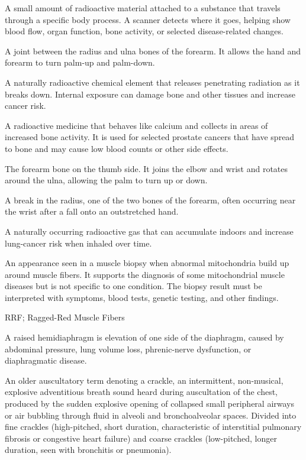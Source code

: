  A small amount of radioactive material attached to a substance that travels through a specific body process. A scanner detects where it goes, helping show blood flow, organ function, bone activity, or selected disease-related changes.

 A joint between the radius and ulna bones of the forearm. It allows the hand and forearm to turn palm-up and palm-down.

 A naturally radioactive chemical element that releases penetrating radiation as it breaks down. Internal exposure can damage bone and other tissues and increase cancer risk.

 A radioactive medicine that behaves like calcium and collects in areas of increased bone activity. It is used for selected prostate cancers that have spread to bone and may cause low blood counts or other side effects.

 The forearm bone on the thumb side. It joins the elbow and wrist and rotates around the ulna, allowing the palm to turn up or down.

 A break in the radius, one of the two bones of the forearm, often occurring near the wrist after a fall onto an outstretched hand.

 A naturally occurring radioactive gas that can accumulate indoors and increase lung-cancer risk when inhaled over time.

 An appearance seen in a muscle biopsy when abnormal mitochondria build up around muscle fibers. It supports the diagnosis of some mitochondrial muscle diseases but is not specific to one condition. The biopsy result must be interpreted with symptoms, blood tests, genetic testing, and other findings.

\synonyms
RRF; Ragged-Red Muscle Fibers

 A raised hemidiaphragm is elevation of one side of the diaphragm, caused by abdominal pressure, lung volume loss, phrenic-nerve dysfunction, or diaphragmatic disease.

 An older auscultatory term denoting a crackle, an intermittent, non-musical, explosive adventitious breath sound heard during auscultation of the chest, produced by the sudden explosive opening of collapsed small peripheral airways or air bubbling through fluid in alveoli and bronchoalveolar spaces. Divided into fine crackles (high-pitched, short duration, characteristic of interstitial pulmonary fibrosis or congestive heart failure) and coarse crackles (low-pitched, longer duration, seen with bronchitis or pneumonia).

